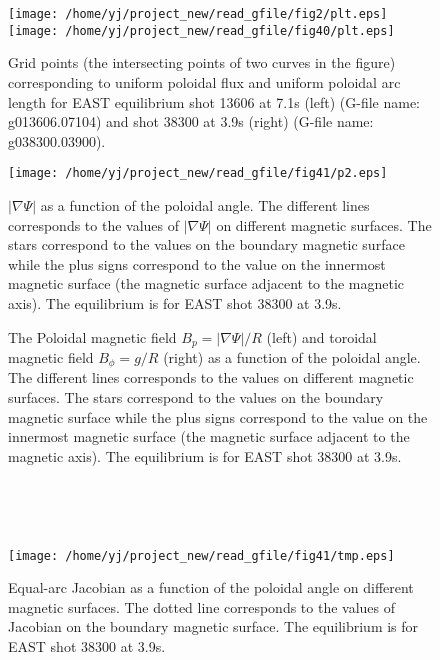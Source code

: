 \documentclass{llncs}
\begin{document}
\begin{figure}[h]
  \texttt{[image: /home/yj/project\_new/read\_gfile/fig2/plt.eps]}\texttt{[image: /home/yj/project\_new/read\_gfile/fig40/plt.eps]}
  \caption{Grid points (the intersecting points of two curves in the figure)
  corresponding to uniform poloidal flux and uniform poloidal arc length for
  EAST equilibrium shot 13606 at 7.1s (left) (G-file name: g013606.07104) and
  shot 38300 at 3.9s (right) (G-file name: g038300.03900).}
\end{figure}

\begin{figure}[h]
  \texttt{[image: /home/yj/project\_new/read\_gfile/fig41/p2.eps]}
  \caption{$| \nabla \Psi |$ as a function of the poloidal angle. The
  different lines corresponds to the values of $| \nabla \Psi |$ on different
  magnetic surfaces. The stars correspond to the values on the boundary
  magnetic surface while the plus signs correspond to the value on the
  innermost magnetic surface (the magnetic surface adjacent to the magnetic
  axis). The equilibrium is for EAST shot 38300 at 3.9s.}
\end{figure}

\begin{figure}[h]
  \caption{The Poloidal magnetic field $B_p = | \nabla \Psi | / R$ (left) and
  toroidal magnetic field $B_{\phi} = g / R$ (right) as a function of the
  poloidal angle. The different lines corresponds to the values on different
  magnetic surfaces. The stars correspond to the values on the boundary
  magnetic surface while the plus signs correspond to the value on the
  innermost magnetic surface (the magnetic surface adjacent to the magnetic
  axis). The equilibrium is for EAST shot 38300 at 3.9s.}
\end{figure}

\

\

\begin{figure}[h]
  \texttt{[image: /home/yj/project\_new/read\_gfile/fig41/tmp.eps]}
  \caption{Equal-arc Jacobian as a function of the poloidal angle on different
  magnetic surfaces. The dotted line corresponds to the values of Jacobian on
  the boundary magnetic surface. The equilibrium is for EAST shot 38300 at
  3.9s.}
\end{figure}
\end{document}
